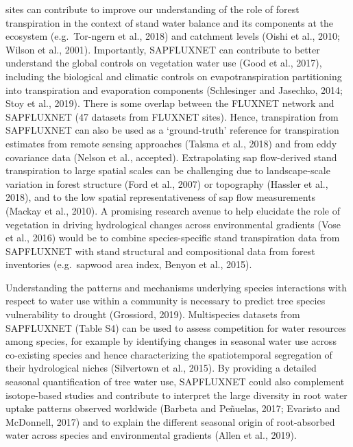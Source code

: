 \documentclass[11pt,twoside]{reedthesis}
\begin{document}
sites can contribute to improve our understanding of the role of forest
transpiration in the context of stand water balance and its components
at the ecosystem (e.g.~Tor-ngern et al., 2018) and catchment levels
(Oishi et al., 2010; Wilson et al., 2001). Importantly, SAPFLUXNET can
contribute to better understand the global controls on vegetation water
use (Good et al., 2017), including the biological and climatic controls
on evapotranspiration partitioning into transpiration and evaporation
components (Schlesinger and Jasechko, 2014; Stoy et al., 2019). There is
some overlap between the FLUXNET network and SAPFLUXNET (47 datasets
from FLUXNET sites). Hence, transpiration from SAPFLUXNET can also be
used as a `ground-truth' reference for transpiration estimates from
remote sensing approaches (Talsma et al., 2018) and from eddy covariance
data (Nelson et al., accepted). Extrapolating sap flow-derived stand
transpiration to large spatial scales can be challenging due to
landscape-scale variation in forest structure (Ford et al., 2007) or
topography (Hassler et al., 2018), and to the low spatial
representativeness of sap flow measurements (Mackay et al., 2010). A
promising research avenue to help elucidate the role of vegetation in
driving hydrological changes across environmental gradients (Vose et
al., 2016) would be to combine species-specific stand transpiration data
from SAPFLUXNET with stand structural and compositional data from forest
inventories (e.g.~sapwood area index, Benyon et al., 2015).\par

Understanding the patterns and mechanisms underlying species
interactions with respect to water use within a community is necessary
to predict tree species vulnerability to drought (Grossiord, 2019).
Multispecies datasets from SAPFLUXNET (Table S4) can be used to assess
competition for water resources among species, for example by
identifying changes in seasonal water use across co-existing species and
hence characterizing the spatiotemporal segregation of their
hydrological niches (Silvertown et al., 2015). By providing a detailed
seasonal quantification of tree water use, SAPFLUXNET could also
complement isotope-based studies and contribute to interpret the large
diversity in root water uptake patterns observed worldwide (Barbeta and
Peñuelas, 2017; Evaristo and McDonnell, 2017) and to explain the
different seasonal origin of root-absorbed water across species and
environmental gradients (Allen et al., 2019).\par
\end{document}
